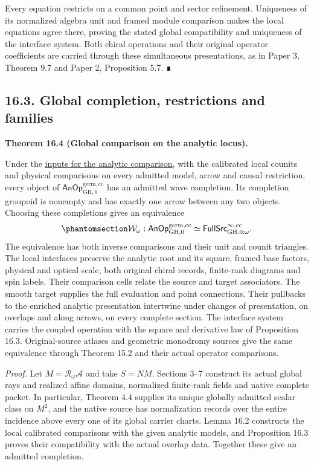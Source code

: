 \documentclass[
  english,
  11pt,
  reqno]{amsart}
\makeatletter
\newcounter{none} %
\newcommand{\paperdisplaynext}{%
  \let\paper@savedstartsection\@startsection
  \def\@startsection##1##2##3##4##5##6{%
    \let\@startsection\paper@savedstartsection
    \@tempskipa ##5\relax
    \ifdim\@tempskipa<\z@
      \def\paper@afterskip{.35\baselineskip}%
    \else
      \def\paper@afterskip{##5}%
    \fi
    \@startsection{##1}{##2}{##3}{##4}{\paper@afterskip}{##6}}}
\newcommand{\paperdisplaysection}{\paperdisplaynext\subsection}
\newcommand{\pandocstatementheading}[1]{%
  \par\if@nobreak\else
    \addpenalty{\@beginparpenalty}%
    \addvspace{.5\baselineskip plus .2\baselineskip minus .2\baselineskip}%
  \fi
  {\normalfont\bfseries #1\par}%
  \nobreak\@afterindenttrue\@afterheading
}
\makeatother
\begin{document}
Every equation restricts on a common point and sector refinement.
Uniqueness of its normalized algebra unit and framed module comparison
makes the local equations agree there, proving the stated global
compatibility and uniqueness of the interface system. Both chiral
operations and their original operator coefficients are carried through
these simultaneous presentations, as in Paper 3, Theorem 9.7 and Paper
2, Proposition 5.7. ∎

\protect{}\label{sec:analytic-wave-global-equivalence}
\paperdisplaysection{16.3. Global completion, restrictions and
families}\label{global-completion-restrictions-and-families}
\pandocstatementheading{\protect{}\label{thm:global-analytic-wave-comparison}Theorem 16.4 (Global comparison on the analytic locus).}

Under the \hyperref[sec:analytic-interface-input-contract]{inputs for
the analytic comparison}, with the calibrated local counits and physical
comparisons on every admitted model, arrow and causal restriction, every
object of \(\mathsf{AnOp}^{\mathrm{germ},\mathrm{cc}}_{\mathrm{GH},0}\)
has an admitted wave completion. Its completion groupoid is nonempty and
has exactly one arrow between any two objects. Choosing these
completions gives an equivalence
\begin{equation}\protect\phantomsection\label{eq:global-analytic-wave-equivalence}{
\mathcal W_\omega:
\mathsf{AnOp}^{\mathrm{germ},\mathrm{cc}}_{\mathrm{GH},0}
\simeq
\mathsf{FullSrc}^{\infty,\mathrm{cc}}_{\mathrm{GH},0;\omega}.
}\end{equation} The equivalence has both inverse comparisons and their
unit and counit triangles. The local interfaces preserve the analytic
root and its square, framed base factors, physical and optical scale,
both original chiral records, finite-rank diagrams and spin labels.
Their comparison cells relate the source and target associators. The
smooth target supplies the full evaluation and point connections. Their
pullbacks to the enriched analytic presentation intertwine under changes
of presentation, on overlaps and along arrows, on every complete
section. The interface system carries the coupled operation with the
square and derivative law of Proposition 16.3. Original-source atlases
and geometric monodromy sources give the same equivalence through
Theorem 15.2 and their actual operator comparisons.

\emph{Proof.} Let \(M=\mathcal R_\omega\mathcal A\) and take \(S=N M\).
Sections 3--7 construct its actual global rays and realized affine
domains, normalized finite-rank fields and native complete packet. In
particular, Theorem 4.4 supplies its unique globally admitted scalar
class on \(M^2\), and the native source has normalization records over
the entire incidence above every one of its global carrier charts. Lemma
16.2 constructs the local calibrated comparisons with the given analytic
models, and Proposition 16.3 proves their compatibility with the actual
overlap data. Together these give an admitted completion.
\end{document}
